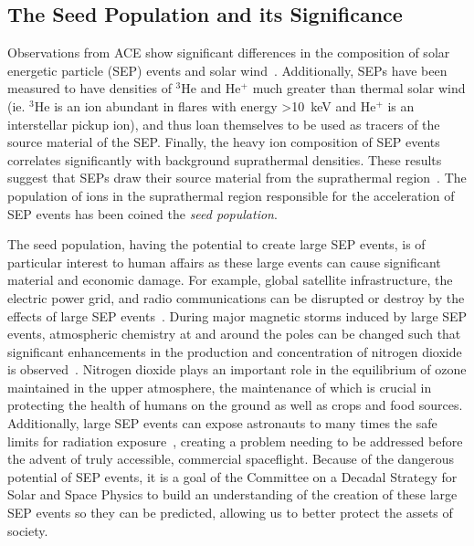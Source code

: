 \documentclass[letterpaper,11pt]{article}
\begin{document}

\subsection{The Seed Population and its Significance}
Observations from ACE show significant differences in the composition of solar energetic particle (SEP) events and solar wind~\citep{Mewaldt2012}.  Additionally, SEPs have been measured to have densities of ${}^3$He and He${}^+$ much greater than thermal solar wind (ie. ${}^3$He is an ion abundant in flares with energy \SI{>10}{\kilo\electronvolt} and He${}^+$ is an interstellar pickup ion), and thus loan themselves to be used as tracers of the source material of the SEP.  Finally, the heavy ion composition of SEP events correlates significantly with background suprathermal densities.  These results suggest that SEPs draw their source material from the suprathermal region~\citep{Desai2006}.  The population of ions in the suprathermal region responsible for the acceleration of SEP events has been coined the \textit{seed population}.

The seed population, having the potential to create large SEP events, is of particular interest to human affairs as these large events can cause significant material and economic damage.  For example, global satellite infrastructure, the electric power grid, and radio communications can be disrupted or destroy by the effects of large SEP events~\citep{Decadal2013,Desai2016}.  During major magnetic storms induced by large SEP events, atmospheric chemistry at and around the poles can be changed such that significant enhancements in the production and concentration of nitrogen dioxide is observed~\citep{Decadal2013}.  Nitrogen dioxide plays an important role in the equilibrium of ozone maintained in the upper atmosphere, the maintenance of which is crucial in protecting the health of humans on the ground as well as crops and food sources.  Additionally, large SEP events can expose astronauts to many times the safe limits for radiation exposure~\citep{Decadal2013}, creating a problem needing to be addressed before the advent of truly accessible, commercial spaceflight.  Because of the dangerous potential of SEP events, it is a goal of the Committee on a Decadal Strategy for Solar and Space Physics to build an understanding of the creation of these large SEP events so they can be predicted, allowing us to better protect the assets of society.
\end{document}
